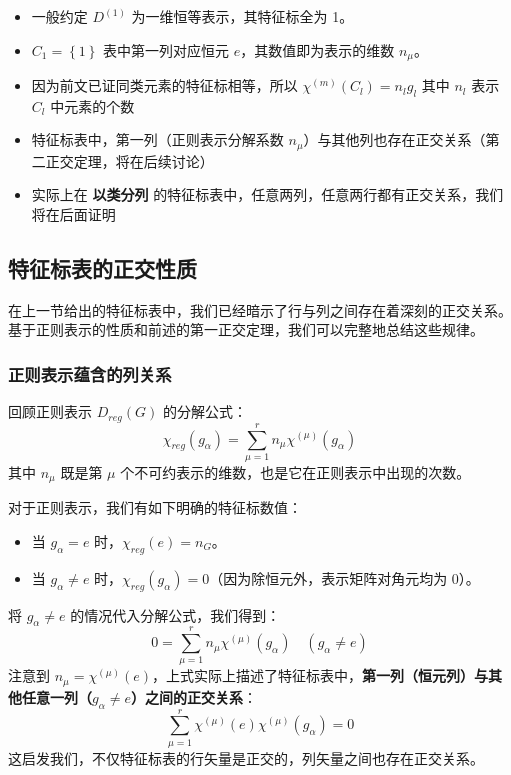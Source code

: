 \begin{note}
    \begin{itemize}
        \item 一般约定 $D^{(1)}$ 为一维恒等表示，其特征标全为 1。
        \item $C_{1}=\left\{ 1 \right\}$ 表中第一列对应恒元 $e$，其数值即为表示的维数 $n_\mu$。
        \item 因为前文已证同类元素的特征标相等，所以 $\chi^{(m)}(C_{l})=n_{l}g_{l}$ 其中 $n_{l}$ 表示 $C_{l}$ 中元素的个数
        \item 特征标表中，第一列（正则表示分解系数 $n_\mu$）与其他列也存在正交关系（第二正交定理，将在后续讨论）
        \item 实际上在 \textbf{以类分列} 的特征标表中，任意两列，任意两行都有正交关系，我们将在后面证明
        
    \end{itemize}
\end{note}



\subsection{特征标表的正交性质}

在上一节给出的特征标表中，我们已经暗示了行与列之间存在着深刻的正交关系。基于正则表示的性质和前述的第一正交定理，我们可以完整地总结这些规律。

\subsubsection{正则表示蕴含的列关系}
回顾正则表示 $D_{reg}(G)$ 的分解公式：
\begin{equation}
    \chi_{reg}(g_\alpha) = \sum_{\mu=1}^r n_\mu \chi^{(\mu)}(g_\alpha)
\end{equation}
其中 $n_\mu$ 既是第 $\mu$ 个不可约表示的维数，也是它在正则表示中出现的次数。

对于正则表示，我们有如下明确的特征标数值：
\begin{itemize}
    \item 当 $g_\alpha = e$ 时，$\chi_{reg}(e) = n_G$。
    \item 当 $g_\alpha \neq e$ 时，$\chi_{reg}(g_\alpha) = 0$（因为除恒元外，表示矩阵对角元均为 0）。
\end{itemize}

将 $g_\alpha \neq e$ 的情况代入分解公式，我们得到：
\begin{equation}
    0 = \sum_{\mu=1}^r n_\mu \chi^{(\mu)}(g_\alpha) \quad (g_\alpha \neq e)
\end{equation}
注意到 $n_\mu = \chi^{(\mu)}(e)$，上式实际上描述了特征标表中，\textbf{第一列（恒元列）与其他任意一列（$g_\alpha \neq e$）之间的正交关系}：
\begin{equation}
    \sum_{\mu=1}^r \chi^{(\mu)}(e) \chi^{(\mu)}(g_\alpha) = 0
\end{equation}
这启发我们，不仅特征标表的行矢量是正交的，列矢量之间也存在正交关系。

